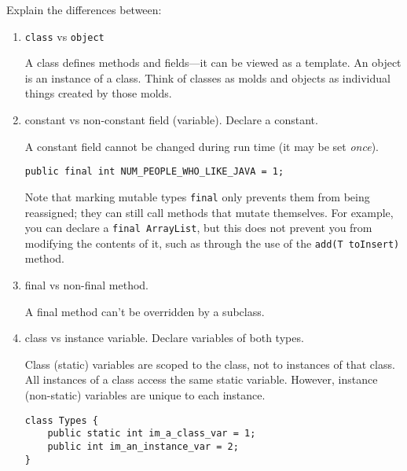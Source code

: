 Explain the differences between:
\begin{enumerate}
	\item {\tt class} vs {\tt object} \\
	\begin{answer}
	A class defines methods and fields---it can be viewed as a template. An object is an instance of a class. Think of classes as molds and objects as individual things created by those molds.
	\end{answer}	
	
	\item constant vs non-constant field (variable). Declare a constant. \\
	\begin{answer}
	A constant field cannot be changed during run time (it may be set {\em once}).
		\begin{lstlisting}[numbers=none]
public final int NUM_PEOPLE_WHO_LIKE_JAVA = 1;
		\end{lstlisting}
	Note that marking mutable types {\tt final} only prevents them from being reassigned; they can still call methods that mutate themselves. For example, you can declare a {\tt final ArrayList}, but this does not prevent you from modifying the contents of it, such as through the use of the {\tt add(T toInsert)} method.
	\end{answer}
	
	\item final vs non-final method. \\
	\begin{answer}
	A final method can't be overridden by a subclass.
	\end{answer}

	\item class vs instance variable. Declare variables of both types.\\
	\begin{answer}
	Class (static) variables are scoped to the class, not to instances of that class. All instances of a class access the same static variable. However, instance (non-static) variables are unique to each instance.
		\begin{lstlisting}[numbers=none]
class Types {
	public static int im_a_class_var = 1;
	public int im_an_instance_var = 2;
}
		\end{lstlisting}
	\end{answer}
	
\end{enumerate}
